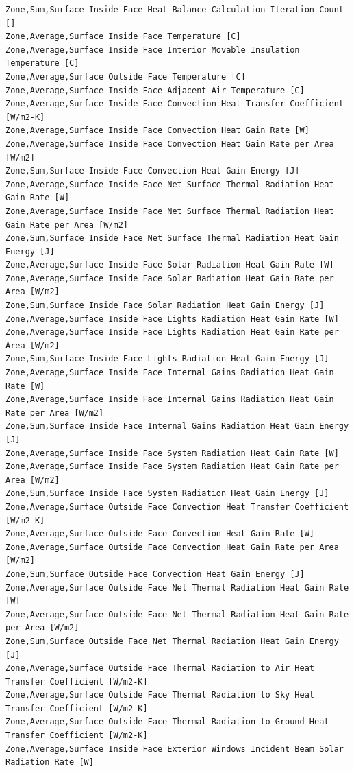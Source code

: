 \begin{lstlisting}
Zone,Sum,Surface Inside Face Heat Balance Calculation Iteration Count []
Zone,Average,Surface Inside Face Temperature [C]
Zone,Average,Surface Inside Face Interior Movable Insulation Temperature [C]
Zone,Average,Surface Outside Face Temperature [C]
Zone,Average,Surface Inside Face Adjacent Air Temperature [C]
Zone,Average,Surface Inside Face Convection Heat Transfer Coefficient [W/m2-K]
Zone,Average,Surface Inside Face Convection Heat Gain Rate [W]
Zone,Average,Surface Inside Face Convection Heat Gain Rate per Area [W/m2]
Zone,Sum,Surface Inside Face Convection Heat Gain Energy [J]
Zone,Average,Surface Inside Face Net Surface Thermal Radiation Heat Gain Rate [W]
Zone,Average,Surface Inside Face Net Surface Thermal Radiation Heat Gain Rate per Area [W/m2]
Zone,Sum,Surface Inside Face Net Surface Thermal Radiation Heat Gain Energy [J]
Zone,Average,Surface Inside Face Solar Radiation Heat Gain Rate [W]
Zone,Average,Surface Inside Face Solar Radiation Heat Gain Rate per Area [W/m2]
Zone,Sum,Surface Inside Face Solar Radiation Heat Gain Energy [J]
Zone,Average,Surface Inside Face Lights Radiation Heat Gain Rate [W]
Zone,Average,Surface Inside Face Lights Radiation Heat Gain Rate per Area [W/m2]
Zone,Sum,Surface Inside Face Lights Radiation Heat Gain Energy [J]
Zone,Average,Surface Inside Face Internal Gains Radiation Heat Gain Rate [W]
Zone,Average,Surface Inside Face Internal Gains Radiation Heat Gain Rate per Area [W/m2]
Zone,Sum,Surface Inside Face Internal Gains Radiation Heat Gain Energy [J]
Zone,Average,Surface Inside Face System Radiation Heat Gain Rate [W]
Zone,Average,Surface Inside Face System Radiation Heat Gain Rate per Area [W/m2]
Zone,Sum,Surface Inside Face System Radiation Heat Gain Energy [J]
Zone,Average,Surface Outside Face Convection Heat Transfer Coefficient [W/m2-K]
Zone,Average,Surface Outside Face Convection Heat Gain Rate [W]
Zone,Average,Surface Outside Face Convection Heat Gain Rate per Area [W/m2]
Zone,Sum,Surface Outside Face Convection Heat Gain Energy [J]
Zone,Average,Surface Outside Face Net Thermal Radiation Heat Gain Rate [W]
Zone,Average,Surface Outside Face Net Thermal Radiation Heat Gain Rate per Area [W/m2]
Zone,Sum,Surface Outside Face Net Thermal Radiation Heat Gain Energy [J]
Zone,Average,Surface Outside Face Thermal Radiation to Air Heat Transfer Coefficient [W/m2-K]
Zone,Average,Surface Outside Face Thermal Radiation to Sky Heat Transfer Coefficient [W/m2-K]
Zone,Average,Surface Outside Face Thermal Radiation to Ground Heat Transfer Coefficient [W/m2-K]
Zone,Average,Surface Inside Face Exterior Windows Incident Beam Solar Radiation Rate [W]

\end{lstlisting}
